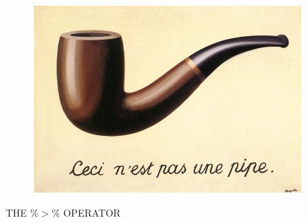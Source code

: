 \documentclass{beamer}
\begin{document}
	

	\begin{frame}
		\begin{figure}
\centering
\includegraphics[width=0.99\linewidth]{images/pipe}

\end{figure}
\begin{center}
		{\huge THE $ \%>\% $ OPERATOR}
\end{center}

		
		
	\end{frame}
	
\end{document}
